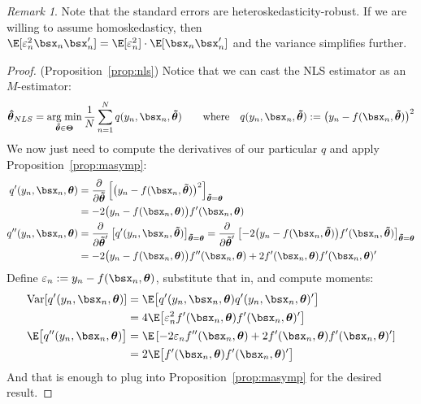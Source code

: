 \documentclass[12pt]{article}
\theoremstyle{plain}
\theoremstyle{definition}
\theoremstyle{remark}
\newtheorem*{rmk}{Remark}
\newcommand{\bstheta}{\boldsymbol{\theta}}
\newcommand{\bsTheta}{\boldsymbol{\Theta}}
\newcommand{\bshattheta}{\boldsymbol{\hat{\theta}}}
\newcommand{\bstildetheta}{\boldsymbol{\tilde{\theta}}}
\DeclareMathOperator*{\argmin}{arg\;min}
\newcommand{\Var}{\operatorname{Var}}
\newcommand{\sumnN}{\sum^N_{n=1}}
\begin{document}
\begin{rmk}
Note that the standard errors are heteroskedasticity-robust. If we are
willing to assume homoskedasticy, then
$\E[\varepsilon_n^2\bsx_n\bsx_n']=\E[\varepsilon_n^2]\cdot\E[\bsx_n\bsx_n']$
and the variance simplifies further.
\end{rmk}
\begin{proof}(Proposition~\ref{prop:nls})
Notice that we can cast the NLS estimator as an $M$-estimator:
\begin{align*}
  \bshattheta_{NLS}
  = \argmin_{\bstildetheta\in\bsTheta}
  \frac{1}{N}\sumnN q(y_n,\bsx_n,\bstildetheta)
  \qquad\text{where}
  \quad
  q(y_n,\bsx_n,\bstildetheta):=
  \big(y_n-f(\bsx_n,\bstildetheta)\big)^2
\end{align*}
We now just need to compute the derivatives of our particular $q$ and
apply Proposition~\ref{prop:masymp}:
\begin{align*}
  q'(y_n,\bsx_n,\bstheta)
  &= \frac{\partial}{\partial \bstildetheta}
  \left[
  \big(y_n-f(\bsx_n,\bstildetheta)\big)^2
  \right]_{\bstildetheta=\bstheta}
  \\
  &=
  -2
  \big(y_n-f(\bsx_n,\bstheta)\big)
  f'(\bsx_n,\bstheta)
  \\
  q''(y_n,\bsx_n,\bstheta)
  &=
  \frac{\partial}{\partial \bstildetheta'}
  \left[
  q'(y_n,\bsx_n,\bstildetheta)
  \right]_{\bstildetheta=\bstheta}
  =
  \frac{\partial}{\partial \bstildetheta'}
  \left[
  -2
  \big(y_n-f(\bsx_n,\bstildetheta)\big)
  f'(\bsx_n,\bstildetheta)
  \right]_{\bstildetheta=\bstheta}
  \\
  &=
  -2
  \big(y_n-f(\bsx_n,\bstheta)\big)
  f''(\bsx_n,\bstheta)
  +2 f'(\bsx_n,\bstheta)f'(\bsx_n,\bstheta)'
\end{align*}
Define $\varepsilon_n:=y_n-f(\bsx_n,\bstheta)$, substitute that in, and
compute moments:
\begin{align}
  \Var[q'(y_n,\bsx_n,\bstheta)]
  &=
  \E\big[q'(y_n,\bsx_n,\bstheta)q'(y_n,\bsx_n,\bstheta)'\big]
  \notag\\
  &=
  4\E\big[\varepsilon_n^2f'(\bsx_n,\bstheta)f'(\bsx_n,\bstheta)'\big]
  \notag\\
  \E\big[q''(y_n,\bsx_n,\bstheta)\big]
  &=
  \E\left[
  -2
  \varepsilon_n
  f''(\bsx_n,\bstheta)
  +2 f'(\bsx_n,\bstheta)f'(\bsx_n,\bstheta)'
  \right]
  \notag\\
  &=
  2 \E\big[
  f'(\bsx_n,\bstheta)f'(\bsx_n,\bstheta)'
  \big]
  \label{nlsproof}
\end{align}
And that is enough to plug into Proposition~\ref{prop:masymp} for the
desired result.


\end{proof}
\end{document}
